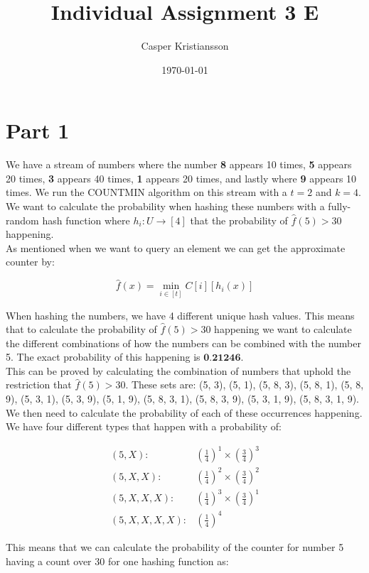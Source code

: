 \documentclass{article}
\title{Individual Assignment 3 E}
\author{Casper Kristiansson}
\date{\today}
\begin{document}
\maketitle

\section{Part 1}
We have a stream of numbers where the number \textbf{8} appears 10 times, \textbf{5} appears 20 times, \textbf{3} appears 40 times, \textbf{1} appears 20 times, and lastly where \textbf{9} appears 10 times. We run the COUNTMIN algorithm on this stream with a \(t=2\) and \(k=4\). We want to calculate the probability when hashing these numbers with a fully-random hash function where \(h_i \colon U \to [4]\) that the probability of \(\hat{f}(5) > 30\) happening. \\

\noindent As mentioned when we want to query an element we can get the approximate counter by:

\[\hat{f}(x) = \min_{i \in [t]} C[i][h_i(x)]\]

\noindent When hashing the numbers, we have 4 different unique hash values. This means that to calculate the probability of \(\hat{f}(5) > 30\) happening we want to calculate the different combinations of how the numbers can be combined with the number 5. The exact probability of this happening is \(\textbf{0.21246}\). \\


\noindent This can be proved by calculating the combination of numbers that uphold the restriction that \(\hat{f}(5) > 30\). These sets are: (5, 3), (5, 1), (5, 8, 3), (5, 8, 1), (5, 8, 9), (5, 3, 1), (5, 3, 9), (5, 1, 9), (5, 8, 3, 1), (5, 8, 3, 9), (5, 3, 1, 9), (5, 8, 3, 1, 9). We then need to calculate the probability of each of these occurrences happening. We have four different types that happen with a probability of:


\begin{align*}
(5, X):& \left(\frac{1}{4}\right)^1 \times \left(\frac{3}{4}\right)^3  \\
(5, X, X):& \left(\frac{1}{4}\right)^2 \times \left(\frac{3}{4}\right)^2 \\
(5, X, X, X):& \left(\frac{1}{4}\right)^3 \times \left(\frac{3}{4}\right)^1 \\
(5, X, X, X, X):& \left(\frac{1}{4}\right)^4
\end{align*}

\noindent This means that we can calculate the probability of the counter for number 5 having a count over 30 for one hashing function as:
\end{document}
